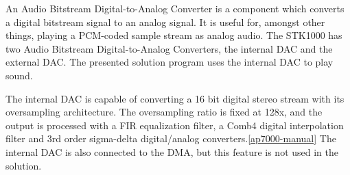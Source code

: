 An Audio Bitstream Digital-to-Analog Converter is a component which converts a digital bitstream signal to an analog signal.
It is useful for, amongst other things, playing a PCM-coded sample stream as analog audio.
The STK1000 has two Audio Bitstream Digital-to-Analog Converters, the internal DAC and the external DAC.
The presented solution program uses the internal DAC to play sound.

The internal DAC is capable of converting a 16 bit digital stereo stream with its oversampling architecture. The oversampling ratio is fixed at 128x, and the output is processed with a FIR equalization filter, a Comb4 digital interpolation filter and 3rd order sigma-delta digital/analog converters.\ref{ap7000-manual}
The internal DAC is also connected to the DMA, but this feature is not used in the solution.
